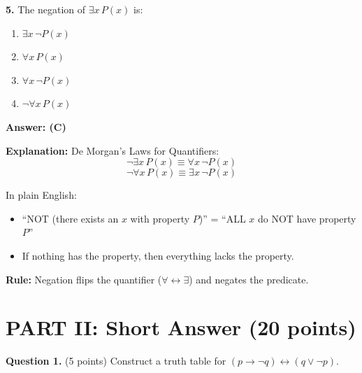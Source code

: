\documentclass[11pt,a4paper]{article}
\begin{document}
\vspace{10pt}

\textbf{5.} The negation of $\exists x\, P(x)$ is:

\begin{enumerate}[label=(\Alph*),noitemsep]
    \item $\exists x\, \neg P(x)$
    \item $\forall x\, P(x)$
    \item $\forall x\, \neg P(x)$
    \item $\neg \forall x\, P(x)$
\end{enumerate}

\begin{solnbox}
\textbf{Answer: (C)}

\textbf{Explanation:} De Morgan's Laws for Quantifiers:
$$\neg \exists x\, P(x) \equiv \forall x\, \neg P(x)$$
$$\neg \forall x\, P(x) \equiv \exists x\, \neg P(x)$$

In plain English:
\begin{itemize}[noitemsep]
    \item ``NOT (there exists an $x$ with property $P$)'' = ``ALL $x$ do NOT have property $P$''
    \item If nothing has the property, then everything lacks the property.
\end{itemize}

\textbf{Rule:} Negation flips the quantifier ($\forall \leftrightarrow \exists$) and negates the predicate.
\end{solnbox}

\newpage

\section*{PART II: Short Answer (20 points)}

\textbf{Question 1.} (5 points) Construct a truth table for $(p \to \neg q) \leftrightarrow (q \lor \neg p)$.
\end{document}
